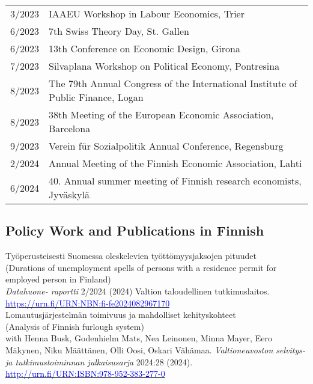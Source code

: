 \documentclass[16pt]{article}
\begin{document}
\begin{tabular}{@{}p{0.5in}p{6in}}
3/2023             & IAAEU Workshop in Labour Economics, Trier \\
6/2023             & 7th Swiss Theory Day, St. Gallen \\
6/2023             & 13th Conference on Economic Design, Girona \\
7/2023             & Silvaplana Workshop on Political Economy, Pontresina \\
8/2023             & The 79th Annual Congress of the International Institute of Public Finance, Logan \\
8/2023             & 38th Meeting of the European Economic Association, Barcelona \\
9/2023             & Verein für Sozialpolitik Annual Conference, Regensburg \\
2/2024             & Annual Meeting of the Finnish Economic Association, Lahti \\
6/2024             & 40. Annual summer meeting of Finnish research economists, Jyväskylä 
\end{tabular}


\subsection*{Policy Work and Publications in Finnish}

\noindent Työperusteisesti Suomessa oleskelevien työttömyysjaksojen pituudet \\
\noindent (Durations of unemployment spells of persons with a residence permit for employed person in Finland) \\
\noindent \textit{Datahuone- raportti} 2/2024 (2024) Valtion taloudellinen tutkimuslaitos. \\
\noindent \href{https://urn.fi/URN:NBN:fi-fe2024082967170}{\textcolor{blue}{https://urn.fi/URN:NBN:fi-fe2024082967170}} \\

\noindent Lomautusjärjestelmän toimivuus ja mahdolliset kehityskohteet \\
\noindent (Analysis of Finnish furlough system) \\
\noindent with Henna Busk, Godenhielm Mats, Nea Leinonen, Minna Mayer, Eero Mäkynen, Niku Määttänen, Olli Oosi, Oskari Vähämaa. \textit{Valtioneuvoston selvitys- ja tutkimustoiminnan julkaisusarja} 2024:28 (2024). \\
\noindent \href{http://urn.fi/URN:ISBN:978-952-383-277-0}{\textcolor{blue}{http://urn.fi/URN:ISBN:978-952-383-277-0}} \\
\end{document}
